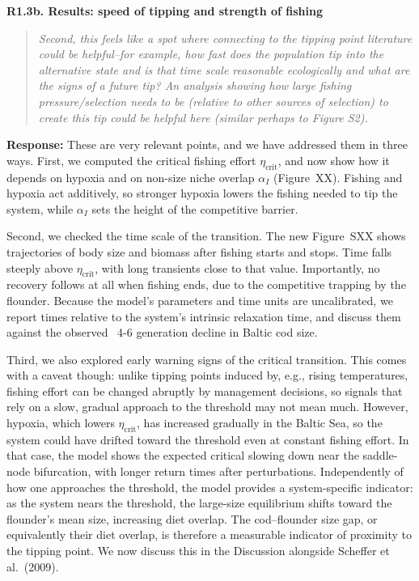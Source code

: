 \documentclass[11pt]{article}
\newenvironment{revcomment}[1]
  {\par\medskip\noindent\textbf{#1}\par\begin{quote}\itshape\color{commentgrey}}
  {\end{quote}}
\newcommand{\response}{\par\noindent\textbf{Response:} }
\begin{document}
\begin{revcomment}{R1.3b. Results: speed of tipping and strength of fishing}
Second, this feels like a spot where connecting to the tipping point literature could be helpful--for example, how fast does the population tip into the alternative state and is that time scale reasonable ecologically and what are the signs of a future tip? An analysis showing how large fishing pressure/selection needs to be (relative to other sources of selection) to create this tip could be helpful here (similar perhaps to Figure S2).
\end{revcomment}

\response These are very relevant points, and we have addressed them in three ways. First, we computed the critical fishing effort $\eta_{\text{crit}}$, and now show how it depends on hypoxia and on non-size niche overlap $\alpha_I$ (Figure~XX). Fishing and hypoxia act additively, so stronger hypoxia lowers the fishing needed to tip the system, while $\alpha_I$ sets the height of the competitive barrier.

Second, we checked the time scale of the transition. The new Figure~SXX shows trajectories of body size and biomass after fishing starts and stops. Time falls steeply above $\eta_{\text{crit}}$, with long transients close to that value. Importantly, no recovery follows at all when fishing ends, due to the competitive trapping by the flounder. Because the model's parameters and time units are uncalibrated, we report times relative to the system's intrinsic relaxation time, and discuss them against the observed ~4-6 generation decline in Baltic cod size.

Third, we also explored early warning signs of the critical transition. This comes with a caveat though: unlike tipping points induced by, e.g., rising temperatures, fishing effort can be changed abruptly by management decisions, so signals that rely on a slow, gradual approach to the threshold may not mean much. However, hypoxia, which lowers $\eta_{\text{crit}}$, has increased gradually in the Baltic Sea, so the system could have drifted toward the threshold even at constant fishing effort. In that case, the model shows the expected critical slowing down near the saddle-node bifurcation, with longer return times after perturbations. Independently of how one approaches the threshold, the model provides a system-specific indicator: as the system nears the threshold, the large-size equilibrium shifts toward the flounder's mean size, increasing diet overlap. The cod–flounder size gap, or equivalently their diet overlap, is therefore a measurable indicator of proximity to the tipping point. We now discuss this in the Discussion alongside Scheffer et al.~(2009).
\end{document}
